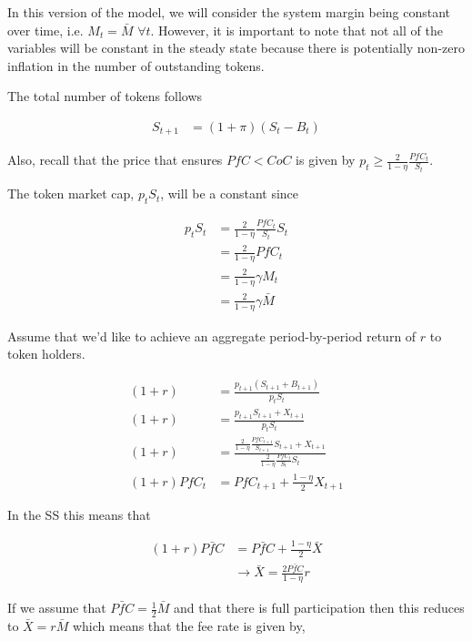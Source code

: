 
In this version of the model, we will consider the system margin being constant over time, i.e.
$M_t = \bar{M}$ $\forall t$. However, it is important to note that not all of the variables will be
constant in the steady state because there is potentially non-zero inflation in the number of
outstanding tokens.

The total number of tokens follows

\begin{align*}
  S_{t+1} &= (1 + \pi) (S_t - B_t)
\end{align*}

Also, recall that the price that ensures $PfC < CoC$ is given by
$p_t \geq \frac{2}{1 - \eta} \frac{PfC_t}{S_t}$.

The token market cap, $p_t S_t$, will be a constant since

\begin{align*}
  p_t S_t &= \frac{2}{1 - \eta} \frac{PfC_t}{S_t} S_t \\
  &= \frac{2}{1 - \eta} PfC_t \\
  &= \frac{2}{1 - \eta} \gamma M_t \\
  &= \frac{2}{1 - \eta} \gamma \bar{M}
\end{align*}

Assume that we'd like to achieve an aggregate period-by-period return of $r$ to token holders.

\begin{align*}
  (1 + r) &= \frac{p_{t+1} (S_{t+1} + B_{t+1})}{p_t S_t} \\
  (1 + r) &= \frac{p_{t+1} S_{t+1} + X_{t+1}}{p_t S_t} \\
  (1 + r) &= \frac{\frac{2}{1 - \eta} \frac{PfC_{t+1}}{S_{t+1}} S_{t+1} + X_{t+1}}{\frac{2}{1 - \eta} \frac{PfC_{t}}{S_t} S_t} \\
  (1 + r) PfC_{t} &= PfC_{t+1} + \frac{1 - \eta}{2} X_{t+1}
\end{align*}

In the SS this means that

\begin{align*}
  (1 + r) \bar{PfC} &= \bar{PfC} + \frac{1 - \eta}{2} \bar{X} \\
  &\rightarrow \bar{X} = \frac{2 \bar{PfC}}{1 - \eta} r
\end{align*}

If we assume that $\bar{PfC} = \frac{1}{2} \bar{M}$ and that there is full participation then this
reduces to $\bar{X} = r \bar{M}$ which means that the fee rate is given by,


